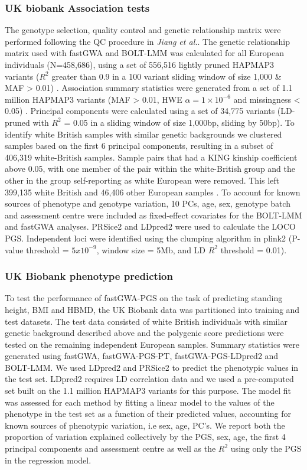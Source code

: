 \documentclass[fleqn,10pt]{wlscirep}
\begin{document}
\subsubsection*{UK biobank Association tests}
The genotype selection, quality control and genetic relationship matrix were performed following the QC procedure in \textit{Jiang et al.}\cite{jiang2019resource}. The genetic relationship matrix used with fastGWA and BOLT-LMM was calculated for all European individuals (N=458,686), using a set of 556,516 lightly pruned HAPMAP3 variants ($R^2$ greater than 0.9 in a 100 variant sliding window of size 1,000 \& MAF  > 0.01) \cite{jiang2019resource}. Association summary statistics were generated from a set of 1.1 million HAPMAP3 variants (MAF > 0.01, HWE $\alpha{=1\times10^{-6}}$ and missingness < 0.05) \cite{jiang2019resource}. Principal components were calculated using a set of 34,775 variants (LD-pruned with $R^2$ = 0.05 in a sliding window of size 1,000bp, sliding by 50bp)\cite{bycroft2018uk}. To identify white British samples with similar genetic backgrounds we clustered samples based on the first 6 principal components\cite{bycroft2018uk}, resulting in a subset of 406,319 white-British samples. Sample pairs that had a KING kinship coefficient above 0.05, with one member of the pair within the white-British group and the other in the group self-reporting as white European were removed. This left 399,135 white British and 46,406 other European samples \cite{manichaikul2010robust,bycroft2018uk}. To account for known sources of phenotype and genotype variation, 10 PCs, age, sex, genotype batch and assessment centre were included as fixed-effect covariates for the BOLT-LMM and fastGWA analyses. PRSice2 and LDpred2 were used to calculate the LOCO PGS. Independent loci were identified using the clumping algorithm in plink2 (P-value threshold = $5x10^{-9}$, window size = 5Mb, and LD $R^2$ threshold = 0.01).

\subsubsection*{UK Biobank phenotype prediction}
To test the performance of fastGWA-PGS on the task of predicting standing height, BMI and HBMD, the UK Biobank data was partitioned into training and test datasets. The test data consisted of white British individuals with similar genetic background described above and the polygenic score predictions were tested on the remaining independent European samples. Summary statistics were generated using fastGWA, fastGWA-PGS-PT, fastGWA-PGS-LDpred2 and BOLT-LMM. We used LDpred2 and PRSice2 to predict the phenotypic values in the test set. LDpred2 requires LD correlation data and we used a pre-computed set built on the 1.1 million HAPMAP3 variants for this purpose. The model fit was assessed for each method by fitting a linear model to the values of the phenotype in the test set as a function of their predicted values, accounting for known sources of phenotypic variation, i.e sex, age, PC's. We report both the proportion of variation explained collectively by the PGS, sex, age, the first 4 principal components and assessment centre as well as the $R^2$ using only the PGS in the regression model.\par
\end{document}
